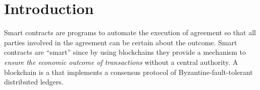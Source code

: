 \documentclass[acmsmall,review,anonymous]{acmart}\settopmatter{printfolios=true,printccs=false,printacmref=false}
\begin{document}




\maketitle


\section{Introduction}




Smart contracts are programs to automate the execution of agreement so that all
parties involved in the agreement can be certain about the outcome.
Smart contracts are ``smart'' since by using blockchains they provide a
mechanism to \emph{ensure the economic outcome of transactions} without a
central authority.
A blockchain is a  that implements a consensus protocol of
Byzantine-fault-tolerant distributed ledgers.
\end{document}
